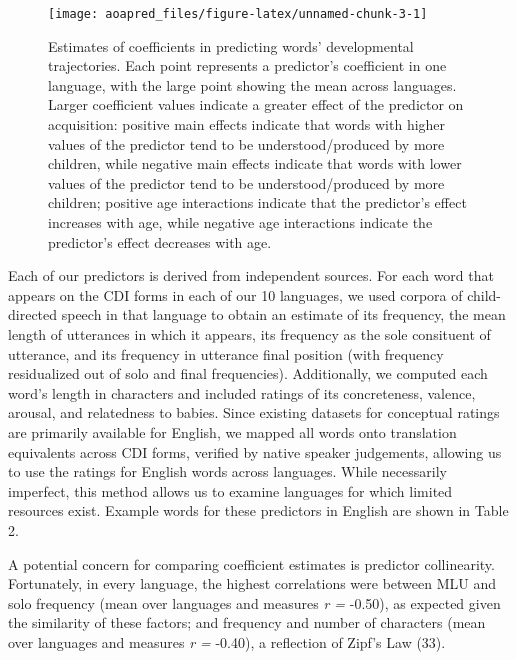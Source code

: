 \documentclass[english,man]{apa6}
\theoremstyle{definition}
\theoremstyle{definition}
\theoremstyle{definition}
\theoremstyle{remark}
\begin{document}
\begin{figure*}

{\centering \texttt{[image: aoapred\_files/figure-latex/unnamed-chunk-3-1]} 

}

\caption{Estimates of coefficients in predicting words' developmental trajectories. Each point represents a predictor's coefficient in one language, with the large point showing the mean across languages. Larger coefficient values indicate a greater effect of the predictor on acquisition: positive main effects indicate that words with higher values of the predictor tend to be understood/produced by more children, while negative main effects indicate that words with lower values of the predictor tend to be understood/produced by more children; positive age interactions indicate that the predictor's effect increases with age, while negative age interactions indicate the predictor's effect decreases with age.}\label{fig:unnamed-chunk-3}
\end{figure*}

Each of our predictors is derived from independent sources. For each
word that appears on the CDI forms in each of our 10 languages, we used
corpora of child-directed speech in that language to obtain an estimate
of its frequency, the mean length of utterances in which it appears, its
frequency as the sole consituent of utterance, and its frequency in
utterance final position (with frequency residualized out of solo and
final frequencies). Additionally, we computed each word's length in
characters and included ratings of its concreteness, valence, arousal,
and relatedness to babies. Since existing datasets for conceptual
ratings are primarily available for English, we mapped all words onto
translation equivalents across CDI forms, verified by native speaker
judgements, allowing us to use the ratings for English words across
languages. While necessarily imperfect, this method allows us to examine
languages for which limited resources exist. Example words for these
predictors in English are shown in Table 2.

A potential concern for comparing coefficient estimates is predictor
collinearity. Fortunately, in every language, the highest correlations
were between MLU and solo frequency (mean over languages and measures
\emph{r = } -0.50), as expected given the similarity of these factors;
and frequency and number of characters (mean over languages and measures
\emph{r = } -0.40), a reflection of Zipf's Law (33).
\end{document}
